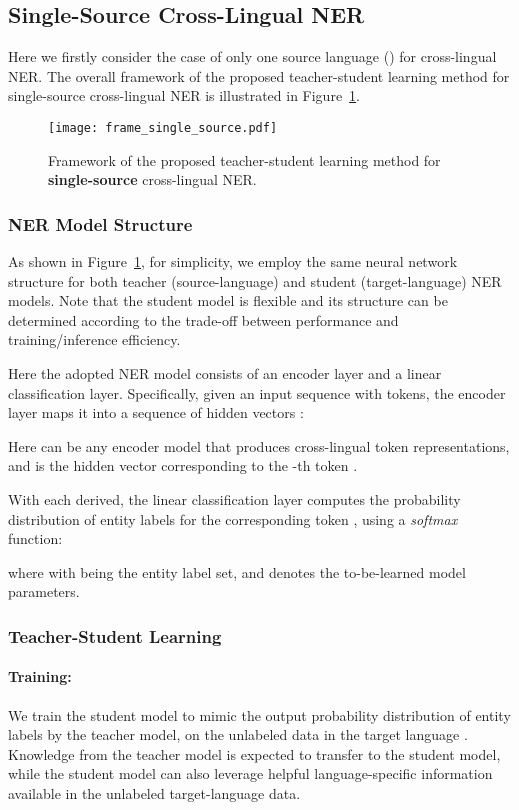 \documentclass[11pt,a4paper]{article}
\begin{document}
	\subsection{Single-Source Cross-Lingual NER}
	Here we firstly consider the case of only one source language () for cross-lingual NER. The overall framework of the proposed teacher-student learning method for single-source cross-lingual NER is illustrated in Figure~\ref{fig:frame_single_source}. 
	
	\begin{figure}[t]
		\centering
		\texttt{[image: frame\_single\_source.pdf]}
		\caption{Framework of the proposed teacher-student learning method for \textbf{single-source} cross-lingual NER.}
		\label{fig:frame_single_source}
	\end{figure}
	
	\subsubsection{NER Model Structure}
	\label{sec:ner_model}
	As shown in Figure~\ref{fig:frame_single_source}, for simplicity, we employ the same neural network structure for both teacher (source-language) and student (target-language) NER models.
	Note that the student model is flexible and its structure can be determined according to the trade-off between performance and training/inference efficiency. 


	Here the adopted NER model consists of an encoder layer and a linear classification layer. Specifically, given an input sequence  with  tokens, the encoder layer  maps it into a sequence of hidden vectors :
	
	Here  can be any encoder model that produces cross-lingual token representations, and  is the hidden vector corresponding to the -th token .
	
	With each  derived, the linear classification layer computes the probability distribution of entity labels for the corresponding token , using a \textit{softmax} function:
	
	where  with  being the entity label set, and  denotes the to-be-learned model parameters.
	
	\subsubsection{Teacher-Student Learning}
	\paragraph{Training: } We train the student model to mimic the output probability distribution of entity labels by the teacher model, on the unlabeled data in the target language . 
	Knowledge from the teacher model is expected to transfer to the student model, while the student model can also leverage helpful language-specific information available in the unlabeled target-language data.
	
\end{document}

